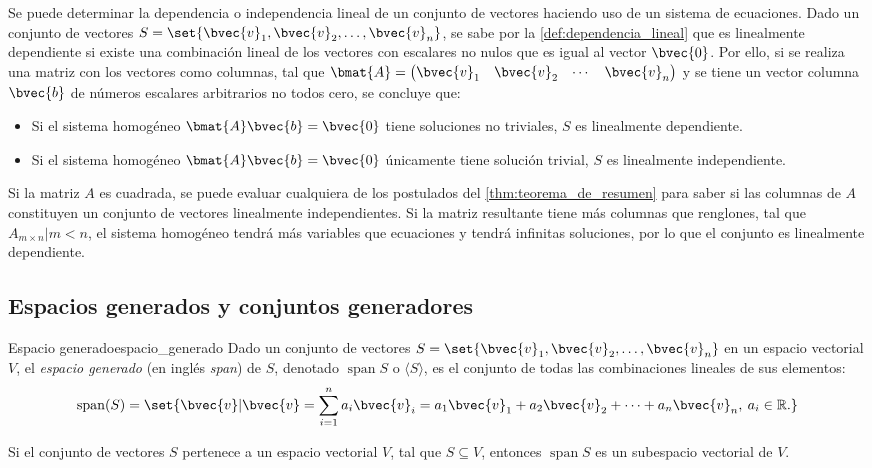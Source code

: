 \documentclass{fmbnotes}
\begin{document}
Se puede determinar la dependencia o independencia lineal de un conjunto de vectores haciendo uso de un sistema de ecuaciones. Dado un conjunto de vectores \(S=\set{\bvec{v}_1,\bvec{v}_2,\ldots,\bvec{v}_n}\), se sabe por la \autoref{def:dependencia_lineal} que es linealmente dependiente si existe una combinación lineal de los vectores con escalares no nulos que es igual al vector \( \bvec{0} \). Por ello, si se realiza una matriz con los vectores como columnas, tal que \(\bmat{A}=\begin{pmatrix}
\bvec{v}_1 & \bvec{v}_2 & \cdots & \bvec{v}_n
\end{pmatrix}\) y se tiene un vector columna \(\bvec{b}\) de números escalares arbitrarios no todos cero, se concluye que:
\begin{itemize}
\item Si el sistema homogéneo \(\bmat{A}\bvec{b}=\bvec{0}\) tiene soluciones no triviales, \(S\) es linealmente dependiente.
\item Si el sistema homogéneo \(\bmat{A}\bvec{b}=\bvec{0}\) únicamente tiene solución trivial, \(S\) es linealmente independiente.
\end{itemize}
Si la matriz \(A\) es cuadrada, se puede evaluar cualquiera de los postulados del \autoref{thm:teorema_de_resumen} para saber si las columnas de \(A\) constituyen un conjunto de vectores linealmente independientes. Si la matriz resultante tiene más columnas que renglones, tal que \(A_{m \times n}|m<n\), el sistema homogéneo tendrá más variables que ecuaciones y tendrá infinitas soluciones, por lo que el conjunto es linealmente dependiente. 

\subsection{Espacios generados y conjuntos generadores}

\begin{definicion}{Espacio generado}{espacio_generado}
Dado un conjunto de vectores \(S=\set{\bvec{v}_1,\bvec{v}_2,\ldots,\bvec{v}_n}\) en un espacio vectorial \(V\), el \emph{espacio generado} (en inglés \textit{span}) de \(S\), denotado \(\operatorname{span} S\) o \(\langle S \rangle\), es el conjunto de todas las combinaciones lineales de sus elementos:
\[\operatorname{span}(S) = \set{\bvec{v}|\bvec{v}=\sum_{i=1}^{n}a_i\bvec{v}_i=a_1\bvec{v}_1+a_2\bvec{v}_2+\cdots+a_n\bvec{v}_n,\: a_i \in \mathbb{R}.}\] 
\end{definicion}
Si el conjunto de vectores \(S\) pertenece a un espacio vectorial \(V\), tal que \(S \subseteq V\), entonces \(\operatorname{span} S\) es un subespacio vectorial de \(V\).
\end{document}

